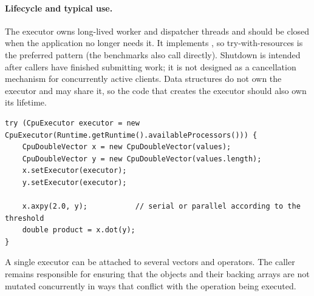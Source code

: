 \documentclass[main.tex]{subfiles}
\begin{document}
    \paragraph{Lifecycle and typical use.}
    The executor owns long-lived worker and dispatcher threads and should be closed when the application no longer needs it. It implements , so try-with-resources is the preferred pattern (the benchmarks also call  directly). Shutdown is intended after callers have finished submitting work; it is not designed as a cancellation mechanism for concurrently active clients. Data structures do not own the executor and may share it, so the code that creates the executor should also own its lifetime.

    \begin{lstlisting}
try (CpuExecutor executor = new CpuExecutor(Runtime.getRuntime().availableProcessors())) {
    CpuDoubleVector x = new CpuDoubleVector(values);
    CpuDoubleVector y = new CpuDoubleVector(values.length);
    x.setExecutor(executor);
    y.setExecutor(executor);

    x.axpy(2.0, y);           // serial or parallel according to the threshold
    double product = x.dot(y);
}
    \end{lstlisting}

    A single executor can be attached to several vectors and operators. The caller remains responsible for ensuring that the objects and their backing arrays are not mutated concurrently in ways that conflict with the operation being executed.
\end{document}
